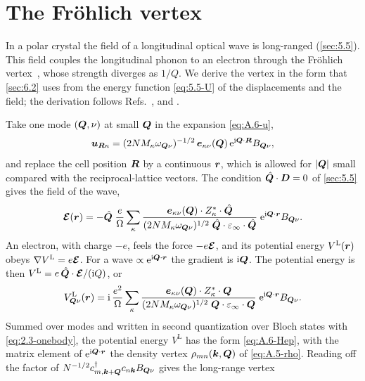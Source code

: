 \section{The Fr\"ohlich vertex}\label{app:D.14}

In a polar crystal the field of a longitudinal optical wave is long-ranged (\cref{sec:5.5}). This field couples the longitudinal phonon to an electron through the Fr\"ohlich vertex~\cite{frohlich1954electrons}, whose strength diverges as $1/Q$. We derive the vertex in the form that \cref{sec:6.2} uses from the energy function \cref{eq:5.5-U} of the displacements and the field; the derivation follows Refs.~\cite{born1954dynamical}, \cite[Sect.~II.D.2]{baroni2001phonons} and \cite{gonze1997dynamical}.

Take one mode $(\bm{Q},\nu)$ at small $\bm{Q}$ in the expansion \cref{eq:A.6-u},
\begin{equation*}
  \bm{u}_{\bm{R}\kappa} = (2NM_\kappa\omega_{\bm{Q}\nu})^{-1/2}\,\bm{e}_{\kappa\nu}(\bm{Q})\,\mathrm{e}^{\mathrm{i}\bm{Q}\cdot\bm{R}}B_{\bm{Q}\nu} ,
\end{equation*}
and replace the cell position $\bm{R}$ by a continuous $\bm{r}$, which is allowed for $|\bm{Q}|$ small compared with the reciprocal-lattice vectors. The condition $\hat{\bm{Q}}\cdot\bm{D} = 0$ of \cref{sec:5.5} gives the field of the wave,
\begin{equation*}
  \bm{\mathcal{E}}(\bm{r}) = -\hat{\bm{Q}}\;\frac{e}{\Omega}\sum_\kappa\frac{\bm{e}_{\kappa\nu}(\bm{Q})\cdot Z^*_\kappa\cdot\hat{\bm{Q}}}{(2NM_\kappa\omega_{\bm{Q}\nu})^{1/2}\;\hat{\bm{Q}}\cdot\varepsilon_\infty\cdot\hat{\bm{Q}}}\;\mathrm{e}^{\mathrm{i}\bm{Q}\cdot\bm{r}}B_{\bm{Q}\nu} .
\end{equation*}
An electron, with charge $-e$, feels the force $-e\bm{\mathcal{E}}$, and its potential energy $V^{\mathrm{L}}(\bm{r})$ obeys $\nabla V^{\mathrm{L}} = e\bm{\mathcal{E}}$. For a wave $\propto\mathrm{e}^{\mathrm{i}\bm{Q}\cdot\bm{r}}$ the gradient is $\mathrm{i}\bm{Q}$. The potential energy is then $V^{\mathrm{L}} = e\,\hat{\bm{Q}}\cdot\bm{\mathcal{E}}/(\mathrm{i} Q)$, or
\begin{equation*}
  V^{\mathrm{L}}_{\bm{Q}\nu}(\bm{r}) = \mathrm{i}\,\frac{e^2}{\Omega}\sum_\kappa\frac{\bm{e}_{\kappa\nu}(\bm{Q})\cdot Z^*_\kappa\cdot\bm{Q}}{(2NM_\kappa\omega_{\bm{Q}\nu})^{1/2}\;\bm{Q}\cdot\varepsilon_\infty\cdot\bm{Q}}\;\mathrm{e}^{\mathrm{i}\bm{Q}\cdot\bm{r}}B_{\bm{Q}\nu} .
\end{equation*}
Summed over modes and written in second quantization over Bloch states with \cref{eq:2.3-onebody}, the potential energy $V^{\mathrm{L}}$ has the form \cref{eq:A.6-Hep}, with the matrix element of $\mathrm{e}^{\mathrm{i}\bm{Q}\cdot\bm{r}}$ the density vertex $\rho_{mn}(\bm{k},\bm{Q})$ of \cref{eq:A.5-rho}. Reading off the factor of $N^{-1/2}c^\dagger_{m,\bm{k}+\bm{Q}}c_{n\bm{k}}B_{\bm{Q}\nu}$ gives the long-range vertex
